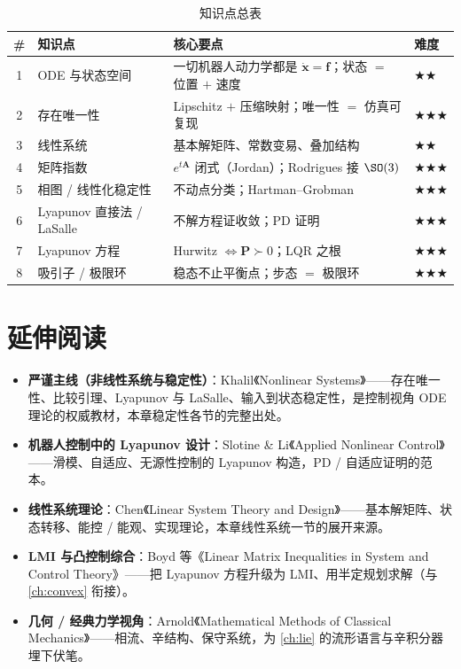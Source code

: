 \begin{table}[H]\centering\small
\caption{知识点总表}
\begin{tabular}{clll}
\toprule
\# & 知识点 & 核心要点 & 难度 \\
\midrule
1 & ODE 与状态空间 & 一切机器人动力学都是 $\dot{\mathbf{x}}=\mathbf{f}$；状态 $=$ 位置 $+$ 速度 & \(\bigstar\bigstar\) \\
2 & 存在唯一性 & Lipschitz $+$ 压缩映射；唯一性 $=$ 仿真可复现 & \(\bigstar\bigstar\bigstar\) \\
3 & 线性系统 & 基本解矩阵、常数变易、叠加结构 & \(\bigstar\bigstar\) \\
4 & 矩阵指数 & $e^{t\mathbf{A}}$ 闭式（Jordan）；Rodrigues 接 $\SO(3)$ & \(\bigstar\bigstar\bigstar\) \\
5 & 相图 / 线性化稳定性 & 不动点分类；Hartman--Grobman & \(\bigstar\bigstar\bigstar\) \\
6 & Lyapunov 直接法 / LaSalle & 不解方程证收敛；PD 证明 & \(\bigstar\bigstar\bigstar\) \\
7 & Lyapunov 方程 & Hurwitz $\iff\mathbf{P}\succ0$；LQR 之根 & \(\bigstar\bigstar\bigstar\) \\
8 & 吸引子 / 极限环 & 稳态不止平衡点；步态 $=$ 极限环 & \(\bigstar\bigstar\bigstar\) \\
\bottomrule
\end{tabular}
\end{table}

\section*{延伸阅读}
\begin{itemize}
  \item \textbf{严谨主线（非线性系统与稳定性）}：Khalil《Nonlinear Systems》\cite{khalil2002nonlinear}——存在唯一性、比较引理、Lyapunov 与 LaSalle、输入到状态稳定性，是控制视角 ODE 理论的权威教材，本章稳定性各节的完整出处。
  \item \textbf{机器人控制中的 Lyapunov 设计}：Slotine \& Li《Applied Nonlinear Control》\cite{slotine1991applied}——滑模、自适应、无源性控制的 Lyapunov 构造，PD / 自适应证明的范本。
  \item \textbf{线性系统理论}：Chen《Linear System Theory and Design》\cite{chen1999linear}——基本解矩阵、状态转移、能控 / 能观、实现理论，本章线性系统一节的展开来源。
  \item \textbf{LMI 与凸控制综合}：Boyd 等《Linear Matrix Inequalities in System and Control Theory》\cite{boyd1994linear}——把 Lyapunov 方程升级为 LMI、用半定规划求解（与 \cref{ch:convex} 衔接）。
  \item \textbf{几何 / 经典力学视角}：Arnold《Mathematical Methods of Classical Mechanics》\cite{arnold1989mathematical}——相流、辛结构、保守系统，为 \cref{ch:lie} 的流形语言与辛积分器埋下伏笔。
\end{itemize}

